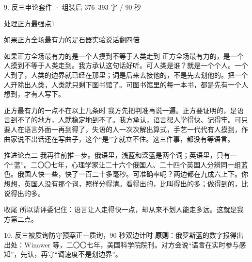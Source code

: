\documentclass[script,con]{debate}
\begin{document}
\begin{kit}{9. 反三申论}{套件 · 组装后 376–393 字 / 90 秒}
\begin{pick}{处理正方最强点}{1}
\begin{module}{如果正方全场最有力的是石器实验说话翻四倍}
\end{module}
\begin{module}{如果正方全场最有力的是一个人摸到不等于人类走到}
正方全场最有力的，是一个人摸到不等于人类走到。我方承认这句话好听。可人类是谁？就是一个个人。一个人到了，人类的边界就已经在那里；词是后来去接他的，不是先去划他的。把一个人开除出人类，人类就只剩下图书馆了。可图书馆里的每一本书，都是先有一个人想到，才有人写下。
\end{module}
\begin{fallback}{正方最有力的一点不在以上几条时}
我方先把判准再说一遍。正方要证明的，是语言到不了的地方，人就稳定地到不了。我方承认，语言帮人学得快、记得牢。可只要人在语言外面一再到得了，失语的人一次次解出算式，手艺一代代有人摸到，作曲家说不出话还在写曲子，这个“是”字就立不住。这三件事，都没有等语言。
\end{fallback}
\end{pick}
\begin{fixed}{推进论点二}
我再往前推一步。俄语里，浅蓝和深蓝是两个词；英语里，只有一个“蓝”。二〇〇七年，心理学家让二十六个俄国人、二十四个英国人分辨同一组蓝色。俄国人快一些，快了一百二十多毫秒。可准确率呢？两边都在九成六上下。你想想，英国人没有那个词，照样分得清。看得出的，比叫得出的多；做得到的，比说得出的多。
\end{fixed}
\begin{fixed}{收尾}
所以请评委记住：语言让人走得快一点，却从来不划人能走多远。这就是我方第二点。
\end{fixed}
\end{kit}

\begin{stage}{10. 反三被质询防守预案}{正一质询，90 秒双边计时}
\textbf{原则}：俄罗斯蓝的数字报得出出处：Winawer 等，二〇〇七年，美国科学院院刊。对方会说“语言在实时参与感知”，先认，再守“调速度不是划边界”。
\begin{qa}
\end{qa}
\end{stage}
\end{document}
